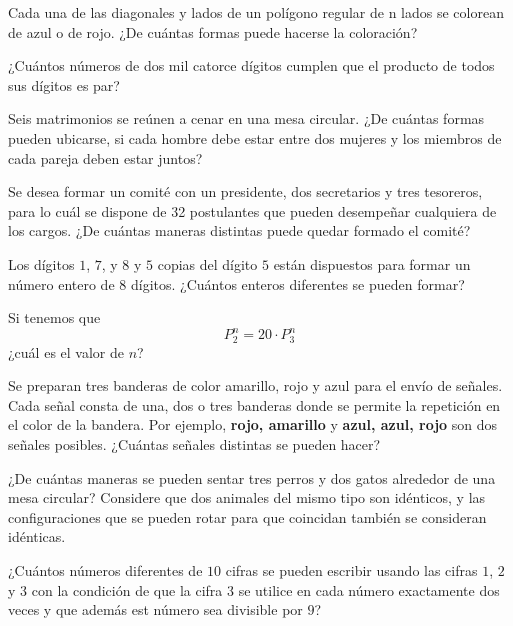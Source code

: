 \begin{problema}
Cada una de las diagonales y lados de un polígono regular de n lados se colorean de azul o
de rojo. ¿De cuántas formas puede hacerse la coloración?
\end{problema}

\begin{problema}
¿Cuántos números de dos mil catorce dígitos cumplen que el producto de todos sus dígitos es par?
\end{problema}

\begin{problema}
Seis matrimonios se reúnen a cenar en una mesa circular. ¿De cuántas formas pueden ubicarse,
si cada hombre debe estar entre dos mujeres y los miembros de cada pareja deben estar juntos?
\end{problema}

\begin{problema}
Se desea formar un comité con un presidente, dos secretarios y tres tesoreros, para lo cuál
se dispone de 32 postulantes que pueden desempeñar cualquiera de los cargos. ¿De cuántas
maneras distintas puede quedar formado el comité?
\end{problema}

\begin{problema}
Los dígitos $1$, $7$, y $8$ y $5$ copias del dígito $5$ están dispuestos para formar un número entero de $8$ dígitos. ¿Cuántos enteros diferentes se pueden formar?
\end{problema}

\begin{problema}
Si tenemos que 
\[P^n_2=20\cdot P^n_3\]
¿cuál es el valor de $n$?
\end{problema}
\begin{problema}
Se preparan tres banderas de color amarillo, rojo y azul para el envío de señales. Cada señal consta de una, dos o tres banderas donde se permite la repetición en el color de la bandera. Por ejemplo, \textbf{rojo, amarillo} y \textbf{azul, azul, rojo} son dos señales posibles. ¿Cuántas señales distintas se pueden hacer?
\end{problema}

\begin{problema}
    ¿De cuántas maneras se pueden sentar tres perros y dos gatos alrededor de una mesa circular? Considere que dos animales del mismo tipo son idénticos, y las configuraciones que se pueden rotar para que coincidan también se consideran idénticas.
\end{problema}

\begin{problema}
¿Cuántos números diferentes de $10$ cifras se pueden escribir usando las cifras $1$, $2$ y $3$ con la condición de que la cifra $3$ se utilice en cada número exactamente dos veces y que además est número sea divisible por $9$?
\end{problema}